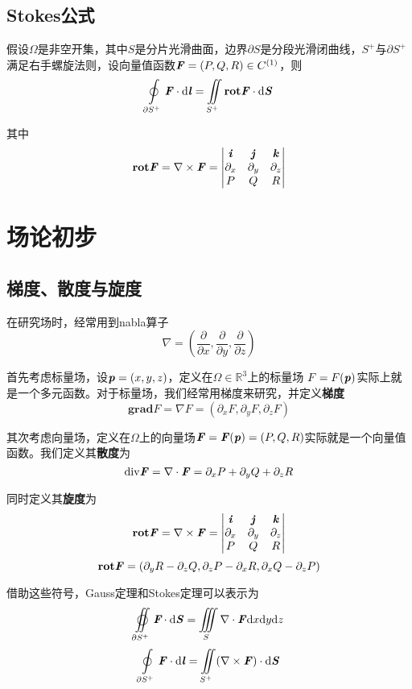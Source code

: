 \documentclass[UTF8,openany]{book}
\begin{document}
	\subsection{Stokes公式}
	\par 假设$\Omega$是非空开集，其中$S$是分片光滑曲面，边界$\partial S$是分段光滑闭曲线，$S^+$与$\partial S^+$满足右手螺旋法则，设向量值函数$\textbf{\textit{F}}=(P,Q,R)\in C^{(1)}$，则
	$$\oint\limits_{\partial S^+}\textbf{\textit{F}}\cdot\mathrm{d}\textbf{\textit{l}}=\iint\limits_{S^+}\textbf{rot}\textbf{\textit{F}}\cdot\mathrm{d}\textbf{\textit{S}}$$
	\par 其中
	$$\textbf{rot}\textbf{\textit{F}}=\nabla\times\textbf{\textit{F}}=
	\begin{vmatrix}
	\textbf{\textit{i}} & \textbf{\textit{j}} & \textbf{\textit{k}} \\
	\partial_x & \partial_y & \partial_z \\
	P & Q & R\\
	\end{vmatrix}$$
	\section{场论初步}
	\subsection{梯度、散度与旋度}
	\par 在研究场时，经常用到nabla算子
	$$\nabla=\left(\frac{\partial}{\partial x},\frac{\partial}{\partial y},\frac{\partial}{\partial z}\right)$$
	\par 首先考虑标量场，设$\textbf{\textit{p}}=(x,y,z)$，定义在$\Omega\in\mathbb{R}^3$上的标量场
	$F=F(\textbf{\textit{p}})$实际上就是一个多元函数。对于标量场，我们经常用梯度来研究，并定义\textbf{梯度}
	$$\mathbf{grad}F=\nabla F=(\partial_x F,\partial_y F, \partial_z F)$$
	\par 其次考虑向量场，定义在$\Omega$上的向量场$\textbf{\textit{F}}=\textbf{\textit{F}}(\textbf{\textit{p}})=(P,Q,R)$实际就是一个向量值函数。我们定义其\textbf{散度}为
	$$\mathrm{div}\textbf{\textit{F}}=\nabla\cdot\textbf{\textit{F}}=\partial_x P+\partial_y Q+\partial_z R$$
	\par 同时定义其\textbf{旋度}为
	$$\textbf{rot}\textbf{\textit{F}}=\nabla\times\textbf{\textit{F}}=
	\begin{vmatrix}
	\textbf{\textit{i}} & \textbf{\textit{j}} & \textbf{\textit{k}}\\
	\partial_x & \partial_y & \partial_z \\
	P & Q & R\\
	\end{vmatrix}$$
	$$\textbf{rot}\textbf{\textit{F}}=(\partial_y R-\partial_z Q,\partial_z P-\partial_x R,\partial_x Q-\partial_z P)$$
	\par 借助这些符号，Gauss定理和Stokes定理可以表示为
	$$\varoiint\limits_{\partial S^+}\textit{\textbf{F}}\cdot\mathrm{d}\textbf{\textit{S}}=\iiint\limits_{S}\nabla\cdot\textbf{\textit{F}}\mathrm{d}x\mathrm{d}y\mathrm{d}z$$
	$$\oint\limits_{\partial S^+}\textbf{\textit{F}}\cdot\mathrm{d}\textbf{\textit{l}}=\iint\limits_{S^+}(\nabla\times\textbf{\textit{F}})\cdot\mathrm{d}\textbf{\textit{S}}$$
\end{document}
